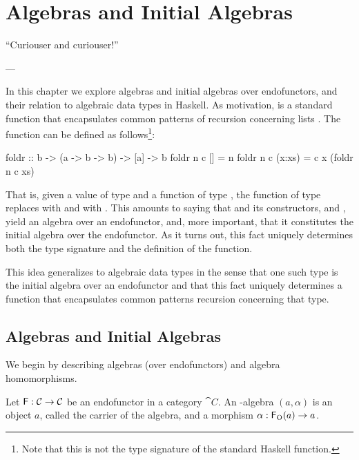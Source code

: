 \chapter{Algebras and Initial Algebras}
\label{chap:algebras}

\epigraph{
  ``Curiouser and curiouser!''
}{---\textcite[23]{carroll-2004}}

In this chapter we explore algebras and initial algebras over
endofunctors, and their relation to algebraic data types in Haskell.
As motivation,  is a standard function that
encapsulates common patterns of recursion concerning lists
\parencite[355--356]{hutton-1999}. The  function
can be defined as follows\footnote{Note that this is not the type
  signature of the standard Haskell  function.}:
\begin{codehaskell}
foldr :: b -> (a -> b -> b) -> [a] -> b
foldr n c []     = n
foldr n c (x:xs) = c x (foldr n c xs)
\end{codehaskell}
That is, given a value  of type  and a
function  of type , the
function  of type 
replaces \texthaskell{[]} with  and \texthaskell{(:)}
with . This amounts to saying that \texthaskell{[a]}
and its constructors, \texthaskell{[]} and \texthaskell{(:)}, yield an
algebra over an endofunctor, and, more important, that it constitutes
the initial algebra over the endofunctor. As it turns out, this fact
uniquely determines both the type signature and the definition of the
 function.

This idea generalizes to algebraic data types in the sense that one
such type is the initial algebra over an endofunctor and that this
fact uniquely determines a function that encapsulates common patterns
recursion concerning that type.

\section{Algebras and Initial Algebras}
\label{sec:algebras}

We begin by describing algebras (over endofunctors) and algebra
homomorphisms.

\begin{definition}
  \label{def:algebra}


  Let $\mathsf{F}: \mathcal{C} \to \mathcal{C}$ be an endofunctor in a category
  $\cat{C}$. An -al\-ge\-bra $(a,\alpha)$ is an object $a$,
  called the carrier of the algebra, and a morphism $\alpha:
  \mathsf{F}_{\operatorname{O}}(a) \to a$.

\end{definition}

